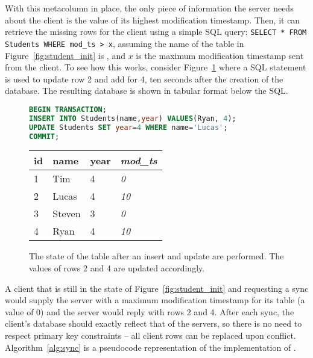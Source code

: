 With this metacolumn in place, the only piece of information the server needs about the
client is the value of its highest modification timestamp. Then, it can retrieve
the missing rows for the client using a simple SQL query: \texttt{SELECT * FROM
Students WHERE mod\_ts > x}, assuming the name of the table in
Figure~\ref{fig:student_init} is , and $x$ is the maximum
modification timestamp sent from the client. To see how this works, consider
Figure~\ref{fig:student_update} where a SQL statement is used to update row 2
and add for 4, ten seconds after the creation of the database. The resulting
database is shown in tabular format below the SQL.

\begin{figure}[h!]
\begin{lstlisting}[language=sql]
BEGIN TRANSACTION;
INSERT INTO Students(name,year) VALUES(Ryan, 4);
UPDATE Students SET year=4 WHERE name='Lucas';
COMMIT;
\end{lstlisting}
\center
\begin{tabular}{ l  l  l  l }
id  & name      & year  & \textit{mod\_ts} \\
\hline
1   & Tim   & 4     & \textit{0}        \\
2   & Lucas     & 4     & \textit{10}        \\
3   & Steven    & 3     & \textit{0}        \\
4   & Ryan      & 4     & \textit{10}        \\
\end{tabular}
\caption{The state of the  table after an insert and update are
performed. The \modts values of rows 2 and 4 are updated accordingly.}
\label{fig:student_update}
\end{figure}

A client that is still in the state of Figure~\ref{fig:student_init} and
requesting a sync would supply the server with a maximum modification
timestamp for its  table (a value of 0) and the server would reply with
rows 2 and 4. After each sync, the client's database should exactly reflect that
of the servers, so there is no need to respect primary key constraints -- all
client rows can be replaced upon conflict. Algorithm~\ref{alg:sync} is a
pseudocode representation of the implementation of \sync.

